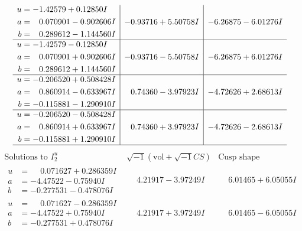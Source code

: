 \documentclass[1p]{elsarticle_modified}
\theoremstyle{definition}
\newcommand{\I}{\sqrt{-1}}
\begin{document}
$$\begin{array}{c|c|c}
\begin{aligned}
u &= -1.42579 + 0.12850 I \\
a &= \phantom{-}0.070901 - 0.902606 I \\
b &= \phantom{-}0.289612 - 1.144560 I\end{aligned}
 & -0.93716 + 5.50758 I & -6.26875 - 6.01276 I \\ \hline\begin{aligned}
u &= -1.42579 - 0.12850 I \\
a &= \phantom{-}0.070901 + 0.902606 I \\
b &= \phantom{-}0.289612 + 1.144560 I\end{aligned}
 & -0.93716 - 5.50758 I & -6.26875 + 6.01276 I \\ \hline\begin{aligned}
u &= -0.206520 + 0.508428 I \\
a &= \phantom{-}0.860914 - 0.633967 I \\
b &= -0.115881 - 1.290910 I\end{aligned}
 & \phantom{-}0.74360 - 3.97923 I & -4.72626 + 2.68613 I \\ \hline\begin{aligned}
u &= -0.206520 - 0.508428 I \\
a &= \phantom{-}0.860914 + 0.633967 I \\
b &= -0.115881 + 1.290910 I\end{aligned}
 & \phantom{-}0.74360 + 3.97923 I & -4.72626 - 2.68613 I\\
 \hline 
 \end{array}$$\newpage$$\begin{array}{c|c|c}  
\text{Solutions to }I^u_{2}& \I (\text{vol} + \sqrt{-1}CS) & \text{Cusp shape}\\
 \hline 
\begin{aligned}
u &= \phantom{-}0.071627 + 0.286359 I \\
a &= -4.47522 - 0.75940 I \\
b &= -0.277531 - 0.478076 I\end{aligned}
 & \phantom{-}4.21917 - 3.97249 I & \phantom{-}6.01465 + 6.05055 I \\ \hline\begin{aligned}
u &= \phantom{-}0.071627 - 0.286359 I \\
a &= -4.47522 + 0.75940 I \\
b &= -0.277531 + 0.478076 I\end{aligned}
 & \phantom{-}4.21917 + 3.97249 I & \phantom{-}6.01465 - 6.05055 I \\ \hline\begin{aligned}

\end{aligned}
\end{array}$$
\end{document}
